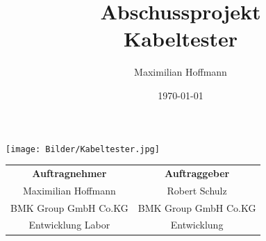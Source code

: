 \documentclass[a4paper,11pt]{scrartcl}
\title{Abschussprojekt \\ Kabeltester}
\author{Maximilian Hoffmann}
\date{\today}
\begin{document}
\maketitle
\begin{center}
   \texttt{[image: Bilder/Kabeltester.jpg]}
\end{center}

\vspace{1,5cm}

\renewcommand{\arraystretch}{2}
\begin{center}
\begin{tabular}[h] {c|c}
\textbf{Auftragnehmer} 		& 	\textbf{Auftraggeber} 	\\
Maximilian Hoffmann			& 	Robert Schulz			\\
BMK Group GmbH Co.KG		&	BMK Group GmbH Co.KG	\\
Entwicklung Labor			& 	Entwicklung		
\end{tabular}
\renewcommand{\arraystretch}{1}
\end{center}


\newpage


\newpage

\tableofcontents
\newpage


\newpage

\newpage

\newpage

\newpage

\newpage

\newpage

\newpage

\newpage

\newpage

\end{document}
